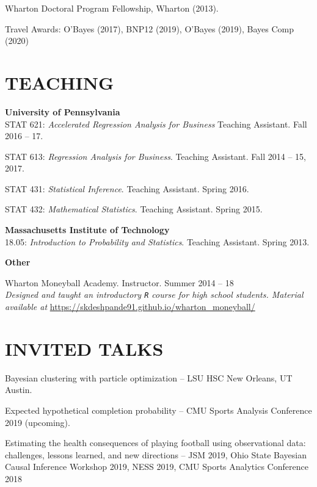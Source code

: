 \documentclass[margin]{res}
\begin{document}
\begin{resume}
Wharton Doctoral Program Fellowship, Wharton (2013).

Travel Awards: O'Bayes (2017), BNP12 (2019), O'Bayes (2019), Bayes Comp (2020)

\section{TEACHING}

\textbf{University of Pennsylvania} \\

STAT 621: {\it Accelerated Regression Analysis for Business} Teaching Assistant. Fall 2016 -- 17.

STAT 613: {\it Regression Analysis for Business}. Teaching Assistant. Fall 2014 -- 15, 2017.

STAT 431: {\it Statistical Inference}. Teaching Assistant. Spring 2016.

STAT 432: {\it Mathematical Statistics}. Teaching Assistant. Spring 2015.


\textbf{Massachusetts Institute of Technology} \\

18.05: {\it Introduction to Probability and Statistics}. Teaching Assistant. Spring 2013.

\textbf{Other}

Wharton Moneyball Academy. Instructor. Summer 2014 -- 18 \\
\textit{Designed and taught an introductory \texttt{R} course for high school students. Material available at}  \url{https://skdeshpande91.github.io/wharton_moneyball/}

\section{INVITED  \hspace{0.1in} TALKS}


Bayesian clustering with particle optimization -- LSU HSC New Orleans, UT Austin. 

Expected hypothetical completion probability -- CMU Sports Analysis Conference 2019 (upcoming).

Estimating the health consequences of playing football using observational data: challenges, lessons learned, and new directions -- JSM 2019, Ohio State Bayesian Causal Inference Workshop 2019, NESS 2019, CMU Sports Analytics Conference 2018



\end{resume}
\end{document}
